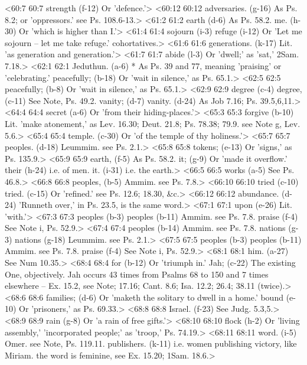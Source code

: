 <60:7 60:7  strength (f-12)  Or 'defence.'>
<60:12 60:12  adversaries. (g-16)  As Ps. 8.2; or 'oppressors.' see Ps. 108.6-13.>
<61:2 61:2  earth (d-6)  As Ps. 58.2.
  me. (h-30)  Or 'which is higher than I.'>
<61:4 61:4  sojourn (i-3)  refuge (i-12)
  Or 'Let me sojourn -- let me take refuge.' cohortatives.>
<61:6 61:6  generations. (k-17)  Lit. 'as generation and generation.'>
<61:7 61:7  abide (l-3)  Or 'dwell;' as 'sat,' 2Sam. 7.18.>
<62:1 62:1  Jeduthun. (a-6)  * As Ps. 39 and 77, meaning 'praising' or 'celebrating.'
  peacefully; (b-18) Or 'wait in silence,' as Ps. 65.1.>
<62:5 62:5  peacefully; (b-8)  Or 'wait in silence,' as Ps. 65.1.>
<62:9 62:9  degree (c-4)  degree, (c-11)
  See Note, Ps. 49.2.
  vanity; (d-7)  vanity. (d-24)
  As Job 7.16; Ps. 39.5,6,11.>
<64:4 64:4  secret (a-6)  Or 'from their hiding-places.'>
<65:3 65:3  forgive (b-10)  Lit. 'make atonement,' as Lev. 16.30; Deut. 21.8; Ps. 78.38; 79.9. see Note g, Lev. 5.6.>
<65:4 65:4  temple. (c-30)  Or 'of the temple of thy holiness.'>
<65:7 65:7  peoples. (d-18)  Leummim. see Ps. 2.1.>
<65:8 65:8  tokens; (e-13)  Or 'signs,' as Ps. 135.9.>
<65:9 65:9  earth, (f-5)  As Ps. 58.2.
  it; (g-9)  Or 'made it overflow.'
  their (h-24)  i.e. of men.
  it. (i-31)  i.e. the earth.>
<66:5 66:5  works (a-5)  See Ps. 46.8.>
<66:8 66:8  peoples, (b-5)  Ammim. see Ps. 7.8.>
<66:10 66:10  tried (c-10)  tried. (c-15)
  Or 'refined.' see Ps. 12.6; 18.30, &c.>
<66:12 66:12  abundance. (d-24)  'Runneth over,' in Ps. 23.5, is the same word.>
<67:1 67:1  upon (e-26)  Lit. 'with.'>
<67:3 67:3  peoples (b-3)  peoples (b-11)
  Ammim. see Ps. 7.8.
  praise (f-4) See Note i, Ps. 52.9.>
<67:4 67:4  peoples (b-14)  Ammim. see Ps. 7.8.
  nations (g-3)  nations (g-18)
  Leummim. see Ps. 2.1.>
<67:5 67:5  peoples (b-3)  peoples (b-11)
  Ammim. see Ps. 7.8.
  praise (f-4)  See Note i, Ps. 52.9.>
<68:1 68:1  him. (a-27)  See Num 10.35.>
<68:4 68:4  for (b-12)  Or 'triumph in.'
  Jah; (c-22)  The existing One, objectively. Jah occurs 43 times from  Psalms 68 to 150 and 7 times elsewhere -- Ex. 15.2, see Note;  17.16; Cant. 8.6; Isa. 12.2; 26.4; 38.11 (twice).>
<68:6 68:6  families; (d-6)  Or 'maketh the solitary to dwell in a home.'
  bound (e-10)  Or 'prisoners,' as Ps. 69.33.>
<68:8 68:8  Israel. (f-23)  See Judg. 5.3,5.>
<68:9 68:9  rain (g-8)  Or 'a rain of free gifts.'>
<68:10 68:10  flock (h-2)  Or 'living assembly,' 'incorporated people;' as 'troop,' Ps. 74.19.>
<68:11 68:11  word. (i-5)  Omer. see Note, Ps. 119.11.
  publishers. (k-11)  i.e. women publishing victory, like Miriam. the word is  feminine, see Ex. 15.20; 1Sam. 18.6.>
